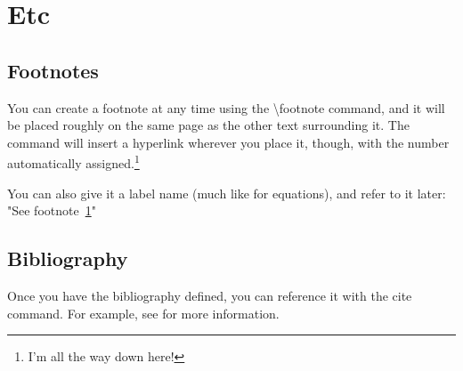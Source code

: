 \documentclass{article}
\begin{document}
\section{Etc}

    \subsection{Footnotes}
        You can create a footnote at any time using the \textbackslash footnote command, and it will be placed roughly on the same page as the other text surrounding it. The command will insert a hyperlink wherever you place it, though, with the number automatically assigned.\footnote{\label{myFootnoteName}I'm all the way down here!}
        
        You can also give it a label name (much like for equations), and refer to it later: "See footnote~\ref{myFootnoteName}"

    \newpage

    \subsection{Bibliography}
    Once you have the bibliography defined, you can reference it with the cite command. For example, see \cite{sourceName2} for more information.


\end{document}
